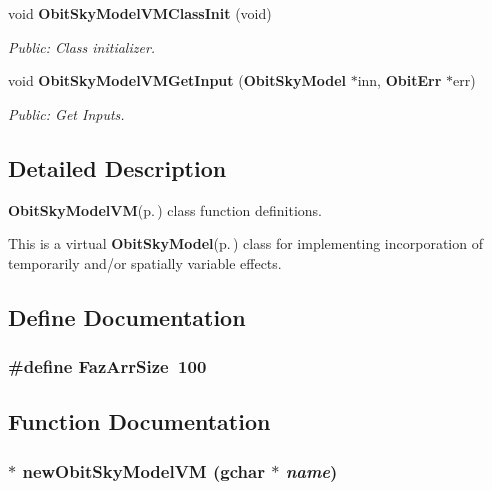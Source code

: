 \begin{CompactItemize}
void {\bf Obit\-Sky\-Model\-VMClass\-Init} (void)
\begin{CompactList}\small\item\em Public: Class initializer. \item\end{CompactList}\item 
void {\bf Obit\-Sky\-Model\-VMGet\-Input} ({\bf Obit\-Sky\-Model} $\ast$inn, {\bf Obit\-Err} $\ast$err)
\begin{CompactList}\small\item\em Public: Get Inputs. \item\end{CompactList}\end{CompactItemize}


\subsection{Detailed Description}
{\bf Obit\-Sky\-Model\-VM}{\rm (p.\,\pageref{structObitSkyModelVM})} class function definitions. 

This is a virtual {\bf Obit\-Sky\-Model}{\rm (p.\,\pageref{structObitSkyModel})} class for implementing incorporation of temporarily and/or spatially variable effects.

\subsection{Define Documentation}
\subsubsection{\setlength{\rightskip}{0pt plus 5cm}\#define Faz\-Arr\-Size\ 100}\label{ObitSkyModelVM_8c_a0}




\subsection{Function Documentation}
\subsubsection{$\ast$ new\-Obit\-Sky\-Model\-VM (gchar $\ast$ {\em name})}\label{ObitSkyModelVM_8c_a12}


